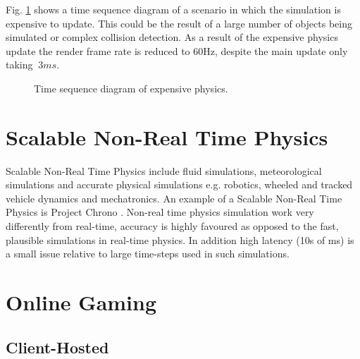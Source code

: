 Fig. \ref{ExpensivePhysics} shows a time sequence diagram of a scenario in which the simulation is expensive to update. This could be the result of a large number of objects being simulated or complex collision detection. As a result of the expensive physics update the render frame rate is reduced to 60Hz, despite the main update only taking $~3ms$.

\begin{figure}
	\centering
	
	\caption{Time sequence diagram of expensive physics.}
	\label{ExpensivePhysics}
\end{figure}

%
%	

\section{Scalable Non-Real Time Physics}
Scalable Non-Real Time Physics include fluid simulations, meteorological simulations and accurate physical simulations e.g. robotics, wheeled and tracked vehicle dynamics and mechatronics. An example of a Scalable Non-Real Time Physics is Project Chrono \cite{Chrono}. Non-real time physics simulation work very differently from real-time, accuracy is highly favoured as opposed to the fast, plausible simulations in real-time physics. In addition high latency (10s of ms) is a small issue relative to large time-steps used in such simulations.

\section{Online Gaming}

\subsection{Client-Hosted}

